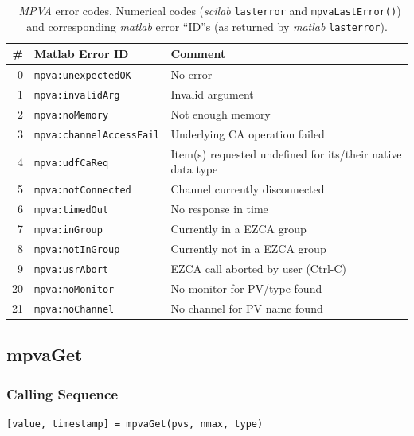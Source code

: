 \documentclass{article}
\newcommand{\sca}{\ita{MPVA}}
\newcommand{\scilab}{\ita{scilab}}
\newcommand{\matlab}{\ita{matlab}}
\newcommand{\com}[1]{{\tt #1}}
\newcommand{\pbrk}{\pagebreak[3]}
\newcommand{\ita}[1]{\emph{#1}}
\renewcommand{\pbrk}{}
\begin{document}
\begin{table}[h]
\begin{tabular}{r|l|p{5.5cm}}
	\#                   &      Matlab Error ID         & Comment \\
	\hline
	0                    & \com{mpva:unexpectedOK}     & No error \\
    1                    & \com{mpva:invalidArg}       & Invalid argument \\
    2                    & \com{mpva:noMemory}         & Not enough memory \\
    3                    & \com{mpva:channelAccessFail}& Underlying CA operation failed \\
    4                    & \com{mpva:udfCaReq}         & Item(s) requested undefined for its/their native data type\\
    5                    & \com{mpva:notConnected}     & Channel currently disconnected\\
    6                    & \com{mpva:timedOut}         & No response in time \\
    7                    & \com{mpva:inGroup}          & Currently in a EZCA group\\
    8                    & \com{mpva:notInGroup}       & Currently not in a EZCA group\\
    9                    & \com{mpva:usrAbort}         & EZCA call aborted by user (Ctrl-C) \\
    20                   & \com{mpva:noMonitor}        & No monitor for PV/type found\\
    21                   & \com{mpva:noChannel}        & No channel for PV name found\\
\end{tabular}
\caption{~\sca{} error codes. Numerical codes (\scilab{} \com{lasterror} and
\com{mpvaLastError()}) and corresponding \matlab{} error ``ID''s
(as returned by \matlab{} \com{lasterror}).}
\label{tbl:errors}
\end{table}


\vspace*{\fill}
\pbrk
\subsection{mpvaGet}
\label{mpvaget}
\subsubsection{Calling Sequence}
\begin{verbatim}
[value, timestamp] = mpvaGet(pvs, nmax, type)
\end{verbatim}
\end{document}
